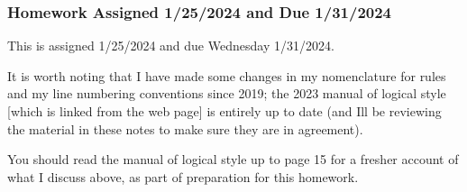 \documentclass[12pt]{article}
\begin{document}
\newpage

\subsubsection{Homework Assigned 1/25/2024 and Due 1/31/2024}

This is assigned 1/25/2024 and due Wednesday 1/31/2024.  

It is worth noting that I have made some changes in my nomenclature for rules and my line numbering conventions since 2019;  the 2023 manual of logical style [which is linked from the web page]  is entirely up to date (and Ill be reviewing the material in these notes to make sure they are in agreement).

You should read the manual of logical style up to page 15 for a fresher account of what I discuss above, as part of preparation for this homework.
\end{document}
